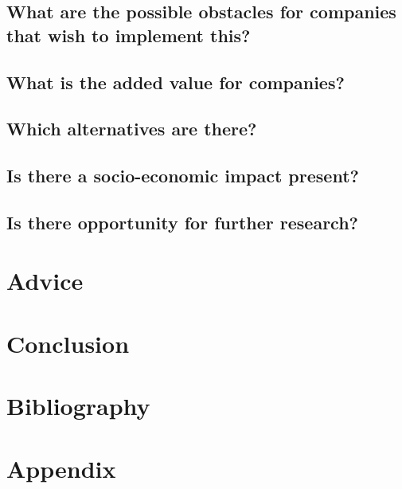 \documentclass{article}
\begin{document}
\subsection{What are the possible obstacles for companies that wish to implement this?}

\subsection{What is the added value for companies?}

\subsection{Which alternatives are there?}

\subsection{Is there a socio-economic impact present?}

\subsection{Is there opportunity for further research?}






\newpage
\section{Advice}

\newpage
\section{Conclusion}

\newpage
\section{Bibliography}
\renewcommand{\bibname}{}
\printbibliography[heading=none]

\newpage
\section{Appendix}
\end{document}
